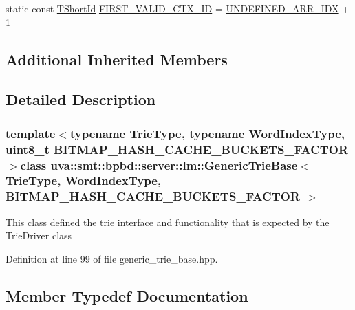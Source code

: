 \begin{DoxyCompactItemize}
\item 
static const \hyperlink{namespaceuva_1_1smt_1_1bpbd_1_1server_1_1lm_1_1identifiers_a33043a191e9a637dea742a89d23c8bdc}{T\+Short\+Id} \hyperlink{classuva_1_1smt_1_1bpbd_1_1server_1_1lm_1_1_generic_trie_base_a6876a5cd50fce0cbb8066a420a42d6c0}{F\+I\+R\+S\+T\+\_\+\+V\+A\+L\+I\+D\+\_\+\+C\+T\+X\+\_\+\+I\+D} = \hyperlink{classuva_1_1smt_1_1bpbd_1_1server_1_1lm_1_1_generic_trie_base_a6fd6f53c986a715dbf7520d84c0f0f20}{U\+N\+D\+E\+F\+I\+N\+E\+D\+\_\+\+A\+R\+R\+\_\+\+I\+D\+X} + 1
\end{DoxyCompactItemize}
\subsection*{Additional Inherited Members}


\subsection{Detailed Description}
\subsubsection*{template$<$typename Trie\+Type, typename Word\+Index\+Type, uint8\+\_\+t B\+I\+T\+M\+A\+P\+\_\+\+H\+A\+S\+H\+\_\+\+C\+A\+C\+H\+E\+\_\+\+B\+U\+C\+K\+E\+T\+S\+\_\+\+F\+A\+C\+T\+O\+R$>$class uva\+::smt\+::bpbd\+::server\+::lm\+::\+Generic\+Trie\+Base$<$ Trie\+Type, Word\+Index\+Type, B\+I\+T\+M\+A\+P\+\_\+\+H\+A\+S\+H\+\_\+\+C\+A\+C\+H\+E\+\_\+\+B\+U\+C\+K\+E\+T\+S\+\_\+\+F\+A\+C\+T\+O\+R $>$}

This class defined the trie interface and functionality that is expected by the Trie\+Driver class 

Definition at line 99 of file generic\+\_\+trie\+\_\+base.\+hpp.



\subsection{Member Typedef Documentation}
\hypertarget{classuva_1_1smt_1_1bpbd_1_1server_1_1lm_1_1_generic_trie_base_a134996f2451e9c4f0891991da4eb749d}{}
